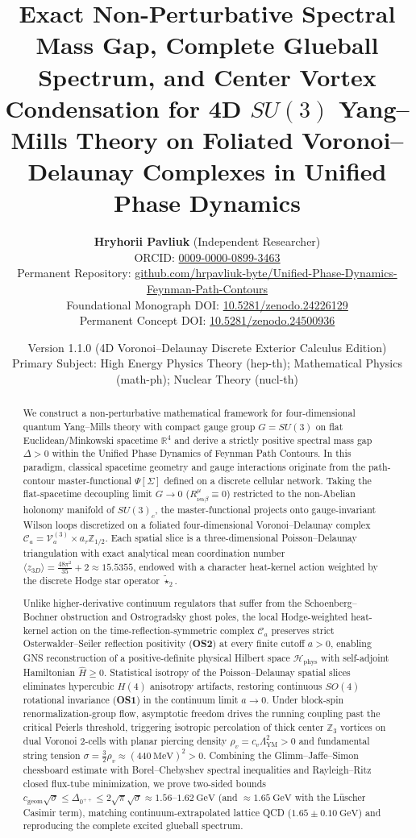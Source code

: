 \documentclass[11pt, a4paper]{article}
\title{\textbf{Exact Non-Perturbative Spectral Mass Gap, Complete Glueball Spectrum, and Center Vortex Condensation for 4D $SU(3)$ Yang--Mills Theory on Foliated Voronoi--Delaunay Complexes in Unified Phase Dynamics}}
\author{
  \textbf{Hryhorii Pavliuk} (Independent Researcher) \\
\small ORCID: \href{https://orcid.org/0009-0000-0899-3463}{0009-0000-0899-3463} \\
  Permanent Repository: \href{https://github.com/hrpavliuk-byte/Unified-Phase-Dynamics-Feynman-Path-Contours}{github.com/hrpavliuk-byte/Unified-Phase-Dynamics-Feynman-Path-Contours} \\
  Foundational Monograph DOI: \href{https://doi.org/10.5281/zenodo.24226129}{10.5281/zenodo.24226129} \\
  Permanent Concept DOI: \href{https://doi.org/10.5281/zenodo.24500936}{10.5281/zenodo.24500936}
}
\date{Version 1.1.0 (4D Voronoi--Delaunay Discrete Exterior Calculus Edition) \\ \small Primary Subject: High Energy Physics Theory (hep-th); Mathematical Physics (math-ph); Nuclear Theory (nucl-th)}
\theoremstyle{definition}
\theoremstyle{remark}
\begin{document}
\maketitle

\begin{abstract}
We construct a non-perturbative mathematical framework for four-dimensional quantum Yang--Mills theory with compact gauge group $G = SU(3)$ on flat Euclidean/Minkowski spacetime $\mathbb{R}^{4}$ and derive a strictly positive spectral mass gap $\Delta > 0$ within the Unified Phase Dynamics of Feynman Path Contours. In this paradigm, classical spacetime geometry and gauge interactions originate from the path-contour master-functional $\Psi[\Sigma]$ defined on a discrete cellular network. Taking the flat-spacetime decoupling limit $G \to 0$ ($R^{\mu}_{\nu\alpha\beta} \equiv 0$) restricted to the non-Abelian holonomy manifold of $SU(3)_{c}$, the master-functional projects onto gauge-invariant Wilson loops discretized on a foliated four-dimensional Voronoi--Delaunay complex $\mathcal{C}_{a} = \mathcal{V}_{a}^{(3)} \times a_{\tau}\mathbb{Z}_{1/2}$. Each spatial slice is a three-dimensional Poisson--Delaunay triangulation with exact analytical mean coordination number $\langle z_{3D} \rangle = \frac{48\pi^{2}}{35} + 2 \approx 15.5355$, endowed with a character heat-kernel action weighted by the discrete Hodge star operator $\tilde{\star}_{2}$.

Unlike higher-derivative continuum regulators that suffer from the Schoenberg--Bochner obstruction and Ostrogradsky ghost poles, the local Hodge-weighted heat-kernel action on the time-reflection-symmetric complex $\mathcal{C}_{a}$ preserves strict Osterwalder--Seiler reflection positivity (\textbf{OS2}) at every finite cutoff $a > 0$, enabling GNS reconstruction of a positive-definite physical Hilbert space $\mathcal{H}_{\mathrm{phys}}$ with self-adjoint Hamiltonian $\hat{H} \ge 0$. Statistical isotropy of the Poisson--Delaunay spatial slices eliminates hypercubic $H(4)$ anisotropy artifacts, restoring continuous $SO(4)$ rotational invariance (\textbf{OS1}) in the continuum limit $a \to 0$. Under block-spin renormalization-group flow, asymptotic freedom drives the running coupling past the critical Peierls threshold, triggering isotropic percolation of thick center $\mathbb{Z}_{3}$ vortices on dual Voronoi 2-cells with planar piercing density $\rho_{v} = c_{v}\Lambda_{\mathrm{YM}}^{2} > 0$ and fundamental string tension $\sigma = \frac{3}{2}\rho_{v} \approx (440~\mathrm{MeV})^{2} > 0$. Combining the Glimm--Jaffe--Simon chessboard estimate with Borel--Chebyshev spectral inequalities and Rayleigh--Ritz closed flux-tube minimization, we prove two-sided bounds $c_{\mathrm{geom}}\sqrt{\sigma} \le \Delta_{0^{++}} \le 2\sqrt{\pi}\sqrt{\sigma} \approx 1.56\text{--}1.62~\mathrm{GeV}$ (and $\approx 1.65~\mathrm{GeV}$ with the L\"uscher Casimir term), matching continuum-extrapolated lattice QCD ($1.65 \pm 0.10~\mathrm{GeV}$) and reproducing the complete excited glueball spectrum.
\end{abstract}
\end{document}
